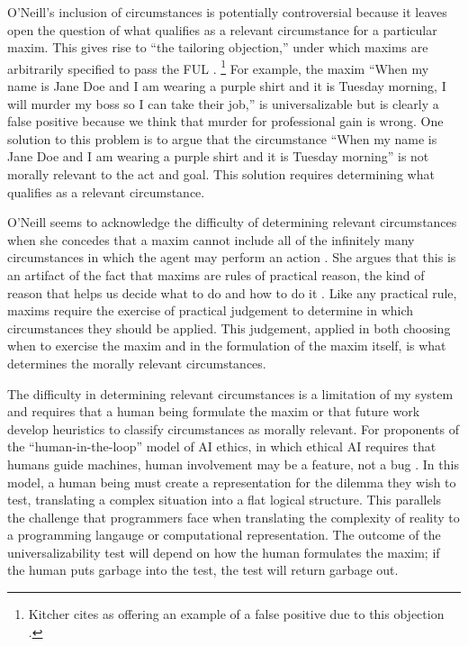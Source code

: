 \begin{isabellebody}
\begin{isamarkuptext}
O'Neill's inclusion of circumstances is potentially controversial because it leaves open the question of what qualifies as a 
relevant circumstance for a particular maxim. This gives rise to ``the tailoring objection,'' 
under which maxims are arbitrarily specified to pass the FUL  \citep[217]{whatisamaxim}. \footnote{Kitcher
cites \citet{kantsethicalthought} as offering an example of a false positive due to this objection \cite{kitcher}.} For example, the maxim ``When my name is Jane Doe
and I am wearing a purple shirt and it is Tuesday morning, I will murder my boss so I can take their job,'' 
is universalizable but is clearly a false positive because we think that murder for professional gain is wrong. 
One solution to this problem is to argue that the circumstance ``When my name is Jane Doe and I am wearing a 
purple shirt and it is Tuesday morning'' is not morally relevant 
to the act and goal. This solution requires determining what qualifies as a relevant circumstance.

O'Neill seems to acknowledge the difficulty of determining relevant circumstances when she concedes that a maxim cannot include all 
of the infinitely many circumstances in which the agent may perform an action \citep[4:428]{actingonprinciple}. She argues that this is 
an artifact of the fact that maxims are rules of practical reason, the kind of reason that helps us decide what to do 
and how to do it \citep{bok}. Like any practical rule, 
maxims require the exercise of practical judgement to determine in which circumstances they should be applied. 
This judgement, applied in both choosing when to exercise the maxim and in the formulation of the maxim 
itself, is what determines the morally relevant circumstances.

The difficulty in determining relevant circumstances is a limitation of my system and requires that a 
human being formulate the maxim or that future work develop heuristics to classify circumstances as morally 
relevant. For proponents of the ``human-in-the-loop'' model of AI ethics, in which ethical AI requires that 
humans guide machines, human involvement may be a feature, not a bug \citep{loop}. In this model, 
a human being must create a representation for the dilemma they wish to test, translating 
a complex situation into a flat logical structure. This parallels the challenge that programmers 
face when translating the complexity of reality to a programming langauge or computational representation. 
The outcome of the universalizability test will depend on how the human formulates the maxim; if the 
human puts garbage into the test, the test will return garbage out.


\end{isamarkuptext}
\end{isabellebody}
